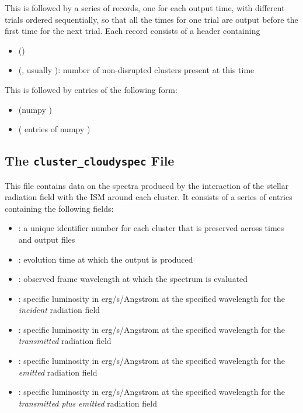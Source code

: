 \documentclass[letterpaper,10pt,english]{sphinxmanual}
\begin{document}
This is followed by a series of records, one for each output time, with different trials ordered sequentially, so that all the times for one trial are output before the first time for the next trial. Each record consists of a header containing
\begin{itemize}
\item {} 
 ()

\item {} 
 (, usually ): number of non-disrupted clusters present at this time

\end{itemize}

This is followed by  entries of the following form:
\begin{itemize}
\item {} 
 (numpy )

\item {} 
 ( entries of numpy )

\end{itemize}


\subsection{The \texttt{cluster\_cloudyspec} File}
\label{cloudy:the-cluster-cloudyspec-file}
This file contains data on the spectra produced by the interaction of
the stellar radiation field with the ISM around each cluster. It
consists of a series of entries containing the following fields:
\begin{itemize}
\item {} 
: a unique identifier number for each cluster that is
preserved across times and output files

\item {} 
: evolution time at which the output is produced

\item {} 
: observed frame wavelength at which the spectrum is evaluated

\item {} 
: specific luminosity in erg/s/Angstrom at the specified
wavelength for the \emph{incident} radiation field

\item {} 
: specific luminosity in erg/s/Angstrom at the specified
wavelength for the \emph{transmitted} radiation field

\item {} 
: specific luminosity in erg/s/Angstrom at the specified
wavelength for the \emph{emitted} radiation field

\item {} 
: specific luminosity in erg/s/Angstrom
at the specified wavelength for the \emph{transmitted plus emitted}
radiation field

\end{itemize}
\end{document}
